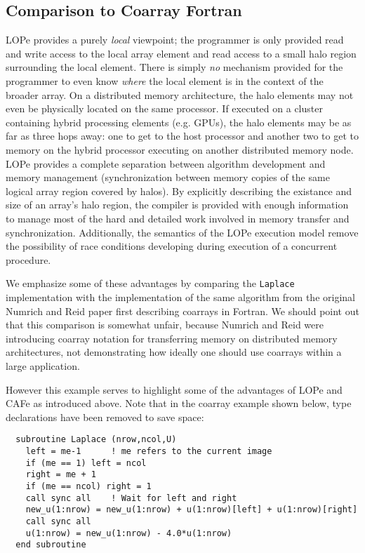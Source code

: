 \subsection{Comparison to Coarray Fortran}

LOPe provides a purely \emph{local} viewpoint; the programmer is only provided read and write access
to the local array element and read access to a small halo region surrounding the local element.
There is simply \emph{no} mechanism provided for the programmer to even know \emph{where} the local
element is in the context of the broader array.  On a distributed memory architecture, the halo
elements may not even be physically located on the same processor.  If executed on a cluster
containing hybrid processing elements (e.g. GPUs), the halo elements may be as far as three hops
away: one to get to the host processor and another two to get to memory on the hybrid processor
executing on another distributed memory node.  LOPe provides a complete separation between algorithm
development and memory management (synchronization between memory copies of the same logical
array region covered by halos).  By explicitly describing the existance and size of an array's halo
region, the compiler is provided with enough information to manage most of the hard and detailed
work involved in memory transfer and synchronization.  Additionally, the semantics of the LOPe
execution model remove the possibility of race conditions developing during execution of a
concurrent procedure.

We emphasize some of these advantages by comparing the \texttt{Laplace} implementation with the
implementation of the same algorithm from the original Numrich and Reid
paper\cite{Numrich:1998:CFP:289918.289920} first describing coarrays in Fortran.  We should point
out that this comparison is somewhat unfair, because Numrich and Reid were introducing coarray
notation for transferring memory on distributed memory architectures, not demonstrating how ideally
one should use coarrays within a large application.

However this example serves
to highlight some of the advantages of LOPe and CAFe as introduced above.  Note that in the coarray
example shown below, type declarations have been removed to save space:
{\small \begin{verbatim}
  subroutine Laplace (nrow,ncol,U)
    left = me-1      ! me refers to the current image
    if (me == 1) left = ncol
    right = me + 1
    if (me == ncol) right = 1
    call sync all    ! Wait for left and right
    new_u(1:nrow) = new_u(1:nrow) + u(1:nrow)[left] + u(1:nrow)[right]
    call sync all
    u(1:nrow) = new_u(1:nrow) - 4.0*u(1:nrow)
  end subroutine
\end{verbatim}}

